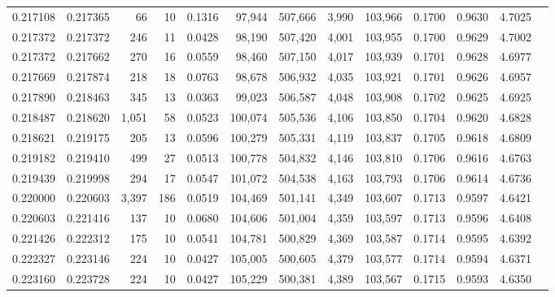 \begin{tabular}{rrrrrrrrrrrrr}
0.217108 & 0.217365 &    66 &  10 &                                     0.1316 &  97,944 & 507,666 &   3,990 & 103,966 & 0.1700 & 0.9630 & 4.7025 \\
0.217372 & 0.217372 &   246 &  11 &                                     0.0428 &  98,190 & 507,420 &   4,001 & 103,955 & 0.1700 & 0.9629 & 4.7002 \\
0.217372 & 0.217662 &   270 &  16 &                                     0.0559 &  98,460 & 507,150 &   4,017 & 103,939 & 0.1701 & 0.9628 & 4.6977 \\
0.217669 & 0.217874 &   218 &  18 &                                     0.0763 &  98,678 & 506,932 &   4,035 & 103,921 & 0.1701 & 0.9626 & 4.6957 \\
0.217890 & 0.218463 &   345 &  13 &                                     0.0363 &  99,023 & 506,587 &   4,048 & 103,908 & 0.1702 & 0.9625 & 4.6925 \\
0.218487 & 0.218620 & 1,051 &  58 &                                     0.0523 & 100,074 & 505,536 &   4,106 & 103,850 & 0.1704 & 0.9620 & 4.6828 \\
0.218621 & 0.219175 &   205 &  13 &                                     0.0596 & 100,279 & 505,331 &   4,119 & 103,837 & 0.1705 & 0.9618 & 4.6809 \\
0.219182 & 0.219410 &   499 &  27 &                                     0.0513 & 100,778 & 504,832 &   4,146 & 103,810 & 0.1706 & 0.9616 & 4.6763 \\
0.219439 & 0.219998 &   294 &  17 &                                     0.0547 & 101,072 & 504,538 &   4,163 & 103,793 & 0.1706 & 0.9614 & 4.6736 \\
0.220000 & 0.220603 & 3,397 & 186 &                                     0.0519 & 104,469 & 501,141 &   4,349 & 103,607 & 0.1713 & 0.9597 & 4.6421 \\
0.220603 & 0.221416 &   137 &  10 &                                     0.0680 & 104,606 & 501,004 &   4,359 & 103,597 & 0.1713 & 0.9596 & 4.6408 \\
0.221426 & 0.222312 &   175 &  10 &                                     0.0541 & 104,781 & 500,829 &   4,369 & 103,587 & 0.1714 & 0.9595 & 4.6392 \\
0.222327 & 0.223146 &   224 &  10 &                                     0.0427 & 105,005 & 500,605 &   4,379 & 103,577 & 0.1714 & 0.9594 & 4.6371 \\
0.223160 & 0.223728 &   224 &  10 &                                     0.0427 & 105,229 & 500,381 &   4,389 & 103,567 & 0.1715 & 0.9593 & 4.6350 \\

\end{tabular}
